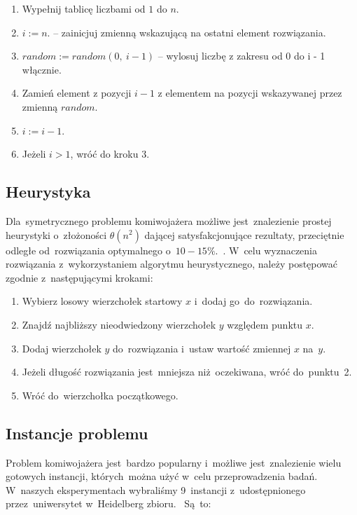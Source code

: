 \begin{enumerate}
    \item Wypełnij tablicę liczbami od $1$ do $n$.
    \item $i := n$. -- zainicjuj zmienną wskazującą na ostatni element rozwiązania.
    \item $random := random(0,\ i - 1) $ -- wylosuj liczbę z zakresu od 0 do i - 1 włącznie.
    \item Zamień element z pozycji $i-1$ z elementem na pozycji wskazywanej przez zmienną $random$.
    \item $i := i-1$.
    \item Jeżeli $i>1$, wróć do kroku 3.
\end{enumerate}


\subsection{Heurystyka}

Dla~symetrycznego problemu komiwojażera możliwe jest~znalezienie prostej heurystyki o~złożoności $\theta(n^2)$ dającej satysfakcjonujące rezultaty, przeciętnie odległe od~rozwiązania optymalnego o~$10-15\%$.~\cite{Heuristic}. W~celu wyznaczenia rozwiązania z~wykorzystaniem algorytmu heurystycznego, należy postępować zgodnie z~następującymi krokami:

\newpage

\begin{enumerate}
    \item Wybierz losowy wierzchołek startowy $x$ i~dodaj go~do~rozwiązania.
    \item Znajdź najbliższy nieodwiedzony wierzchołek $y$ względem punktu $x$.
  	\item Dodaj wierzchołek $y$ do~rozwiązania i~ustaw wartość zmiennej $x$ na~$y$.
    \item Jeżeli długość rozwiązania jest~mniejsza niż~oczekiwana, wróć do~punktu~2.
    \item Wróć do~wierzchołka początkowego.
\end{enumerate}

\subsection{Instancje problemu}

Problem komiwojażera jest~bardzo popularny i~możliwe jest~znalezienie wielu gotowych instancji, których~można użyć w~celu przeprowadzenia badań. W~naszych eksperymentach wybraliśmy 9~instancji z~udostępnionego przez~uniwersytet w~Heidelberg zbioru.~\cite{instances} Są~to:

